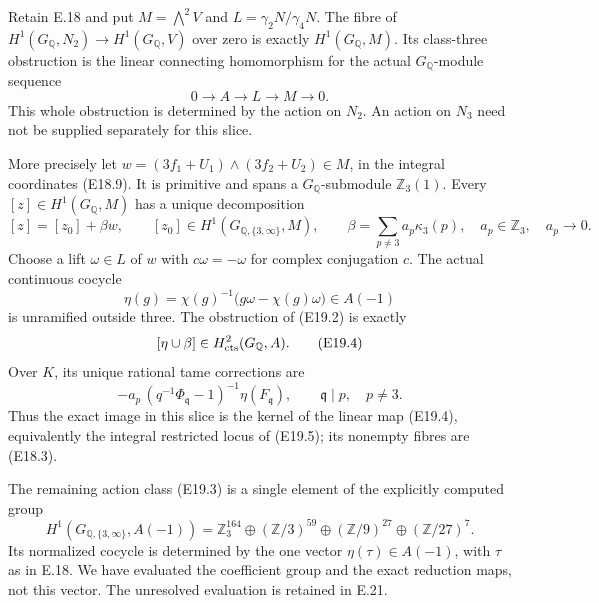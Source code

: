\begin{proposition}
\label{E-zero-slice}
Retain E.18 and put $M=\bigwedge^2V$ and
$L=\gamma_2N/\gamma_4N$. The fibre of
$H^1(G_{\mathbb Q},N_2)\to H^1(G_{\mathbb Q},V)$
over zero is exactly $H^1(G_{\mathbb Q},M)$.
Its class-three obstruction is the linear connecting
homomorphism for the actual $G_{\mathbb Q}$-module
sequence
\[
 0\longrightarrow A\longrightarrow L
       \longrightarrow M\longrightarrow0 .
 \tag{E19.1}
\]
This whole obstruction is determined by the action
on $N_2$. An action on $N_3$ need not be supplied
separately for this slice.

More precisely let
$w=(3f_1+U_1)\wedge(3f_2+U_2)\in M$,
in the integral coordinates (E18.9).
It is primitive and spans a $G_{\mathbb Q}$-submodule
$\mathbb Z_3(1)$. Every $[z]\in H^1(G_{\mathbb Q},M)$
has a unique decomposition
\[
 [z]=[z_0]+\beta w,\qquad
 [z_0]\in H^1(G_{\mathbb Q,\{3,\infty\}},M),
 \qquad \beta=\sum_{p\ne3}a_p\kappa_3(p),
 \quad a_p\in\mathbb Z_3,\quad a_p\to0.
 \tag{E19.2}
\]
Choose a lift $\omega\in L$ of $w$ with
$c\omega=-\omega$ for complex conjugation $c$.
The actual continuous cocycle
\[
 \eta(g)=\chi(g)^{-1}\bigl(g\omega-\chi(g)\omega\bigr)
       \in A(-1)
 \tag{E19.3}
\]
is unramified outside three. The obstruction of
(E19.2) is exactly
\[
                  [\eta\cup\beta]\in
                        H^2_{\rm cts}(G_{\mathbb Q},A).
 \tag{E19.4}
\]
Over $K$, its unique rational tame corrections are
\[
 -a_p\,(q^{-1}\Phi_{\mathfrak q}-1)^{-1}
                          \eta(F_{\mathfrak q}),
       \qquad \mathfrak q\mid p,\quad p\ne3.
 \tag{E19.5}
\]
Thus the exact image in this slice is the kernel
of the linear map (E19.4), equivalently the integral
restricted locus of (E19.5); its nonempty fibres
are (E18.3).

The remaining action class (E19.3) is a single
element of the explicitly computed group
\[
 H^1(G_{\mathbb Q,\{3,\infty\}},A(-1))
 =\mathbb Z_3^{164}\oplus(\mathbb Z/3)^{59}
       \oplus(\mathbb Z/9)^{27}\oplus(\mathbb Z/27)^7.
 \tag{E19.6}
\]
Its normalized cocycle is determined by the one
vector $\eta(\tau)\in A(-1)$, with $\tau$ as in
E.18. We have evaluated the coefficient group
and the exact reduction maps, not this vector.
The unresolved evaluation is retained in E.21.
\end{proposition}

